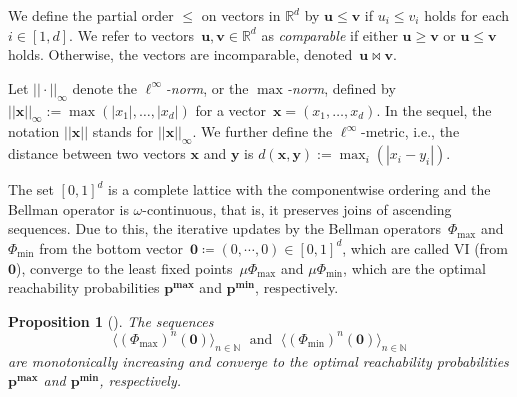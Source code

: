 \documentclass[preprint,12pt]{elsarticle}
\theoremstyle{plain}
\newtheorem{proposition}[theorem]{Proposition}
\theoremstyle{definition}
\theoremstyle{remark}
\theoremstyle{claimstyle}
\newcommand{\RR}{\mathbb{R}}
\newcommand{\NN}{\mathbb{N}}
\begin{document}
We define the partial order $\leq$ on vectors in $\RR^d$ by $\bm{u}\leq \bm{v}$ if $u_i\leq v_i$ holds for each $i\in [1, d]$. 
We refer to vectors~$\bm{u},\bm{v} \in \RR^d$ as \emph{comparable} if either $\bm{u} \geq \bm{v}$ or $\bm{u} \leq \bm{v}$ holds. 
Otherwise, the vectors are incomparable, denoted~$\bm{u} \bowtie \bm{v}$.


Let $||\cdot||_\infty$ denote the \emph{$\ell^\infty$-norm}, or the \emph{$\max$-norm}, defined by \(||\bm{x}||_\infty := \max{\left(|x_1|, \dots, |x_d|\right)}\) for a vector~$\bm{x} = (x_1, \dots, x_d)$.
In the sequel, the notation $||\bm{x}||$ stands for $||\bm{x}||_\infty$.
We further define the $\ell^\infty$-metric, i.e., the distance between two vectors $\bm{x}$ and $\bm{y}$ is
\(d(\bm{x},\bm{y}):= \max_i{\left(|x_i - y_i|\right)}.\)

The set $[0, 1]^d$ is a complete lattice with the componentwise ordering and the Bellman operator is $\omega$-continuous, that is, it preserves joins of ascending sequences.
Due to this, the iterative updates by the Bellman operators~$\Phi_{\max}$ and $\Phi_{\min}$ from the bottom vector~$\bm{0} \coloneqq (0, \cdots, 0)\in [0, 1]^d$, which are called VI (from $\bm{0}$), converge to the least fixed points~$\mu\Phi_{\max}$ and $\mu\Phi_{\min}$, which are the optimal reachability probabilities $\bm{p^{\max}}$ and $\bm{p^{\min}}$, respectively. 
\begin{proposition}[\cite{bk,chatterjee2008vi,Puterman94}]
	The sequences \[\langle(\Phi_{\max})^n(\mathbf{0})\rangle_{n\in \NN} \; \text{ and } \; \langle(\Phi_{\min})^n(\mathbf{0})\rangle_{n\in \NN}\] are monotonically increasing and converge to the optimal reachability probabilities $\bm{p^{\max}}$ and $\bm{p^{\min}}$, respectively.  
\end{proposition}
\end{document}
